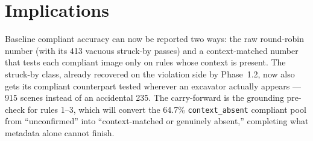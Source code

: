 \section{Implications}

Baseline compliant accuracy can now be reported two ways: the raw round-robin number (with its 413
vacuous struck-by passes) and a context-matched number that tests each compliant image only on rules
whose context is present. The struck-by class, already recovered on the violation side by Phase~1.2,
now also gets its compliant counterpart tested wherever an excavator actually appears --- 915 scenes
instead of an accidental 235. The carry-forward is the grounding pre-check for rules 1--3, which will
convert the 64.7\% \texttt{context\_absent} compliant pool from ``unconfirmed'' into
``context-matched or genuinely absent,'' completing what metadata alone cannot finish.
